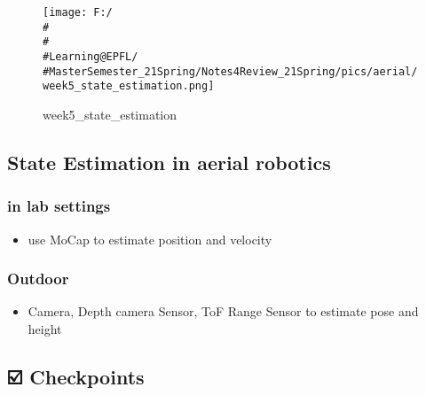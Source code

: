 \documentclass[]{article}
\begin{document}
\begin{figure}
\centering
\texttt{[image: F:/\\\#\\\#\\\#Learning@EPFL/\\\#MasterSemester\_21Spring/Notes4Review\_21Spring/pics/aerial/week5\_state\_estimation.png]}
\caption{week5\_state\_estimation}
\end{figure}

\subsection{State Estimation in aerial robotics}\label{header-n1013}

\subsubsection{in lab settings}\label{header-n1014}

\begin{itemize}
\item
  use MoCap to estimate position and velocity
\end{itemize}

\subsubsection{Outdoor}\label{header-n1018}

\begin{itemize}
\item
  Camera, Depth camera Sensor, ToF Range Sensor to estimate pose and
  height
\end{itemize}

\subsection{☑️ Checkpoints}\label{header-n1022}
\end{document}
